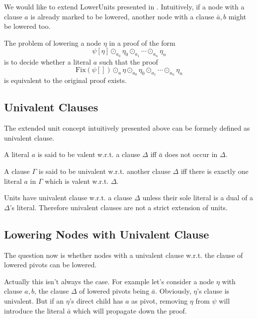 \documentclass{llncs}
\begin{document}
We would like to extend LowerUnits presented in \cite{LURPI}. Intuitively,
if a node with a clause $a$ is already marked to be lowered, another node with
a clause $\bar{a},b$ might be lowered too.

The problem of lowering a node $\eta$ in a proof of the form
\begin{equation}
\psi[\eta] \odot_{a_0} \eta_0 \odot_{a_1} \cdots \odot_{a_n} \eta_n
\end{equation}
is to decide whether a literal $a$ such that the proof 
\begin{equation}
\text{Fix}\left(\psi[]\right) \odot_a \eta \odot_{a_0} \eta_0 \odot_{a_1} \cdots \odot_{a_n} \eta_n
\end{equation}
is equivalent to
the original proof exists.
\subsection{Univalent Clauses}

The extended unit concept intuitively presented above can be formely defined as
univalent clause.

\begin{definition}
A literal $a$ is said to be valent w.r.t. a clause $\Delta$ iff $\bar{a}$ does
not occur in $\Delta$.
\end{definition}

\begin{definition}
A clause $\Gamma$ is said to be univalent w.r.t. another clause $\Delta$ iff
there is exactly one literal $a$ in $\Gamma$ which is valent w.r.t. $\Delta$.
\end{definition}

Units have univalent clause w.r.t. a clause $\Delta$ unless their sole literal
is a dual of a $\Delta$'s literal. Therefore univalent clauses are not a
strict extension of units.


\subsection{Lowering Nodes with Univalent Clause}

The question now is whether nodes with a univalent clause w.r.t. the clause of
lowered pivots can be lowered.

Actually this isn't always the case. For example let's consider a node
$\eta$ with clause $a,b$, the clause $\Delta$ of lowered pivots being
$\bar{a}$. Obviously, $\eta$'s clause is univalent. But if an $\eta$'s
direct child has $a$ as pivot, removing $\eta$ from $\psi$ will introduce
the literal $\bar{a}$ which will propagate down the proof.
\end{document}
